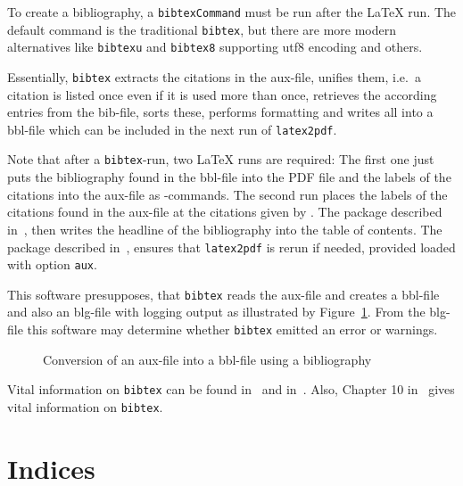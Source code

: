 To create a bibliography, 
a \texttt{bibtexCommand} must be run after the \LaTeX{} run. 
The default command is the traditional \texttt{bibtex}, 
but there are more modern alternatives 
like \texttt{bibtexu} and \texttt{bibtex8} supporting utf8 encoding 
and others. 


Essentially, \texttt{bibtex} extracts the citations in the aux-file, 
unifies them, i.e.~a citation is listed once even if it is used more than once, 
retrieves the according entries from the bib-file, sorts these, 
performs formatting and writes all into a bbl-file 
which can be included in the next run of \texttt{latex2pdf}. 

Note that after a \texttt{bibtex}-run, 
two \LaTeX{} runs are required: 
The first one just puts the bibliography found in the bbl-file 
into the PDF file and the labels of the citations into the aux-file 
as -commands. 
The second run places the labels of the citations found in the aux-file 
at the citations given by . 
The package  described in~\cite{TocBibIndP}, 
then writes the headline of the bibliography into the table of contents.
The package  described in~\cite{RerunFChkP}, 
ensures that \texttt{latex2pdf} is rerun if needed, 
provided loaded with option \texttt{aux}. 


This software presupposes, that \texttt{bibtex} reads the aux-file 
and creates a bbl-file and also an blg-file with logging output 
as illustrated by Figure~\ref{fig:aux2bbl}. 
From the blg-file this software may determine 
whether \texttt{bibtex} emitted an error or warnings. 


\begin{figure}[htb]
\centering
{}
\caption{\label{fig:aux2bbl}
Conversion of an aux-file into a bbl-file using a bibliography}
\end{figure}

Vital information on \texttt{bibtex} can be found in~\cite{BibPat} 
and in~\cite{BibMar}. 
Also, Chapter 10 in~\cite{Gra} gives vital information on \texttt{bibtex}. 


\section{Indices}\label{sec:indices}

